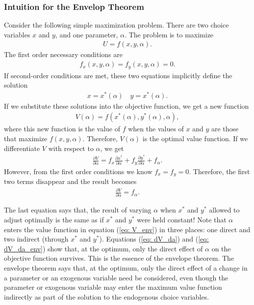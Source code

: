 \documentclass[\topdir/lecture\_notes.tex]{subfiles}
\begin{document}
\begin{optional}
\subsubsection{Intuition for the Envelop Theorem}
Consider the following simple maximization problem. There are two choice variables $x$ and $y$, and one parameter, $\alpha$. The problem is to maximize
\begin{align*}
U=f(x, y, \alpha).
\end{align*}
The first order necessary conditions are
\begin{align*}
f_x(x, y, \alpha)=f_y(x, y, \alpha)=0.
\end{align*}
If second-order conditions are met, these two equations implicitly define the solution
\begin{align*}
x=x^*(\alpha) \quad y=x^*(\alpha).
\end{align*}
If we substitute these solutions into the objective function, we get a new function
\begin{align}
V(\alpha)=f(x^*(\alpha), y^*(\alpha), \alpha), \label{eq: V_env}
\end{align}
where this new function is the value of $f$ when the values of $x$ and $y$ are those that maximize $f(x, y, \alpha)$. Therefore, $V(\alpha)$ is the optimal value function. If we differentiate $V$ with respect to $\alpha$, we get
\begin{align}
\frac{\partial V}{\partial \alpha}=f_x \frac{\partial x^*}{\partial \alpha}+f_y \frac{\partial y^*}{\partial \alpha}+f_\alpha. \label{eq: dV_da}
\end{align}
However, from the first order conditions we know $f_x=f_y=0$. Therefore, the first two terms disappear and the result becomes
\begin{align}
\frac{\partial V}{\partial \alpha}=f_\alpha. \label{eq: dV_da_env}
\end{align}

The last equation says that, the result of varying $\alpha$ when $x^*$ and $y^*$ allowed to adjust optimally is the same as if $x^*$ and $y^*$ were held constant! Note that $\alpha$ enters the value function in equation (\ref{eq: V_env}) in three places: one direct and two indirect (through $x^*$ and $y^*$). Equations (\ref{eq: dV_da}) and (\ref{eq: dV_da_env}) show that, at the optimum, only the direct effect of $\alpha$ on the objective function survives. This is the essence of the envelope theorem. The envelope theorem says that, at the optimum, only the direct effect of a change in a parameter or an exogenous variable need be considered, even though the parameter or exogenous variable may enter the maximum value function indirectly as part of the solution to the endogenous choice variables.
\end{optional}
\end{document}
